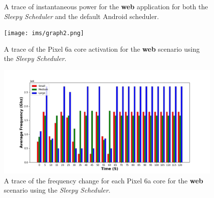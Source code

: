 \documentclass[conference]{IEEEtran}
\begin{document}
\begin{figure}
\caption{A trace of instantaneous power for the \textbf{web} application for both the \emph{Sleepy Scheduler} and the default Android scheduler. }
\label{graph:energytrace}
\end{figure}

\begin{figure}
\begin{center}
\texttt{[image: ims/graph2.png]}
\end{center}
\caption{A trace of the Pixel 6a core activation for the \textbf{web} scenario using the \emph{Sleepy Scheduler}.}
\label{fig:coreson}
\end{figure}

\begin{figure}
\begin{center}
\includegraphics[scale=0.5]{ims/graph_means.png}
\end{center}
\caption{A trace of the frequency change for each Pixel 6a core for the \textbf{web} scenario using the \emph{Sleepy Scheduler}. }
\label{fig:freq}
\end{figure}
\end{document}
